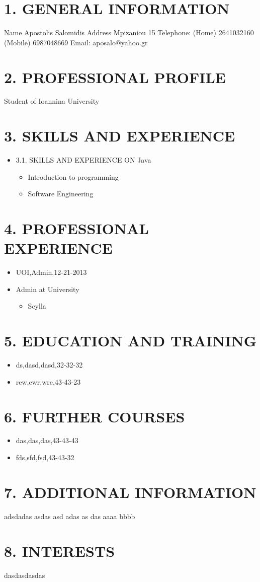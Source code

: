\documentclass[10pt]{article}
\date{}
\begin{document}
\section*{1.	GENERAL INFORMATION}
Name Apostolis Salomidis
Address Mpizaniou 15
Telephone: (Home) 2641032160 (Mobile) 6987048669
Email: aposalo@yahoo.gr
\section*{2.	PROFESSIONAL PROFILE}
		Student of Ioannina University 
\section*{3.	SKILLS AND EXPERIENCE}
\begin{itemize}
	\item 3.1.	SKILLS AND EXPERIENCE ON Java
\begin{itemize}
			\item Introduction to programming
			\item Software Engineering
\end{itemize}
\end{itemize}
\section*{4.	PROFESSIONAL EXPERIENCE}
\begin{itemize}
		\item UOI,Admin,12-21-2013
			\item Admin at University 
\begin{itemize}
				\item Scylla
\end{itemize}
\end{itemize}
\section*{5.	EDUCATION AND TRAINING}
\begin{itemize}
		\item ds,dasd,dasd,32-32-32
		\item rew,ewr,wre,43-43-23
\end{itemize}
\section*{6.	FURTHER COURSES}
\begin{itemize}
		\item das,das,das,43-43-43
		\item fds,sfd,fsd,43-43-32
\end{itemize}
\section*{7.	ADDITIONAL INFORMATION}
		adsdadas asdas asd adas as das
		aaaa bbbb
\section*{8.	INTERESTS}
		dasdasdasdas 
\end{document}
